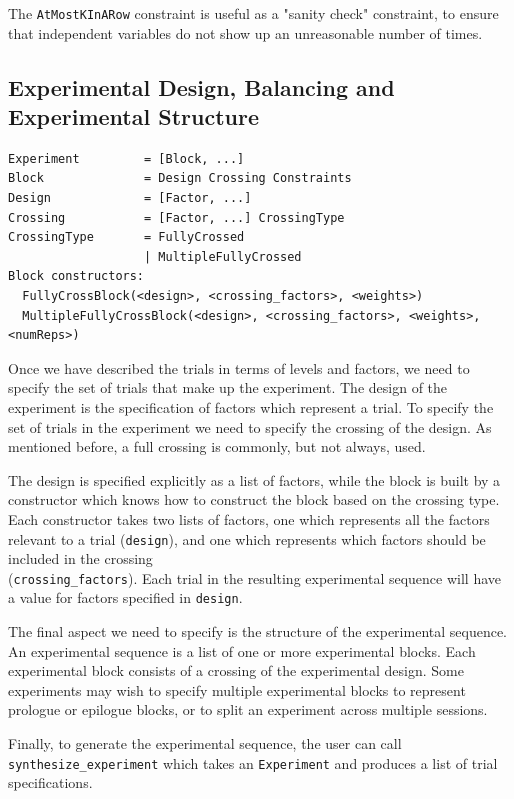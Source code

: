 The \texttt{AtMostKInARow} constraint is useful as a "sanity check" constraint, to ensure that independent variables do not show up an unreasonable number of times.

\subsection{Experimental Design, Balancing and Experimental Structure}

\begin{verbatim}
Experiment         = [Block, ...]
Block              = Design Crossing Constraints
Design             = [Factor, ...]
Crossing           = [Factor, ...] CrossingType
CrossingType       = FullyCrossed
                   | MultipleFullyCrossed
Block constructors:
  FullyCrossBlock(<design>, <crossing_factors>, <weights>)
  MultipleFullyCrossBlock(<design>, <crossing_factors>, <weights>, <numReps>)
\end{verbatim}

Once we have described the trials in terms of levels and factors, we need to specify the set of trials that make up the experiment. The design of the experiment is the specification of factors which represent a trial. To specify the set of trials in the experiment we need to specify the crossing of the design. As mentioned before, a full crossing is commonly, but not always, used.

The design is specified explicitly as a list of factors, while the block is built by a constructor which knows how to construct the block based on the crossing type. Each constructor takes two lists of factors, one which represents all the factors relevant to a trial (\texttt{design}), and one which represents which factors should be included in the crossing\\(\texttt{crossing\_factors}). Each trial in the resulting experimental sequence will have a value for factors specified in \texttt{design}.

The final aspect we need to specify is the structure of the experimental sequence. An experimental sequence is a list of one or more experimental blocks. Each experimental block consists of a crossing of the experimental design. Some experiments may wish to specify multiple experimental blocks to represent prologue or epilogue blocks, or to split an experiment across multiple sessions.

Finally, to generate the experimental sequence, the user can call \texttt{synthesize\_experiment} which takes an \texttt{Experiment} and produces a list of trial specifications.

